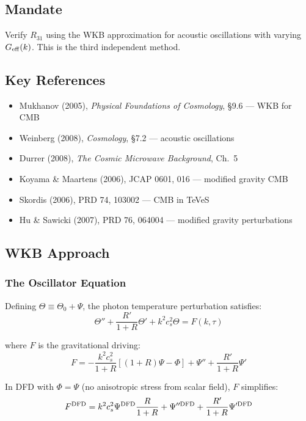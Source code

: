 \documentclass[11pt,a4paper]{article}
\begin{document}
\subsection{Mandate}

Verify $R_{31}$ using the WKB approximation for acoustic oscillations with varying $G_{\rm eff}(k)$. This is the third independent method.

\subsection{Key References}

\begin{itemize}
\item Mukhanov (2005), \emph{Physical Foundations of Cosmology}, \S 9.6 --- WKB for CMB
\item Weinberg (2008), \emph{Cosmology}, \S 7.2 --- acoustic oscillations
\item Durrer (2008), \emph{The Cosmic Microwave Background}, Ch.\ 5
\item Koyama \& Maartens (2006), JCAP 0601, 016 --- modified gravity CMB
\item Skordis (2006), PRD 74, 103002 --- CMB in TeVeS
\item Hu \& Sawicki (2007), PRD 76, 064004 --- modified gravity perturbations
\end{itemize}

\subsection{WKB Approach}

\subsubsection{The Oscillator Equation}

Defining $\Theta \equiv \Theta_0 + \Psi$, the photon temperature perturbation satisfies:
\begin{equation}
\Theta'' + \frac{R'}{1+R}\Theta' + k^2c_s^2\Theta = F(k, \tau)
\end{equation}

where $F$ is the gravitational driving:
\begin{equation}
F = -\frac{k^2c_s^2}{1+R}\left[(1+R)\Psi - \Phi\right] + \Psi'' + \frac{R'}{1+R}\Psi'
\end{equation}

In DFD with $\Phi = \Psi$ (no anisotropic stress from scalar field), $F$ simplifies:
\begin{equation}
F^{\rm DFD} = k^2c_s^2\Psi^{\rm DFD}\frac{R}{1+R} + \Psi''^{\rm DFD} + \frac{R'}{1+R}\Psi'^{\rm DFD}
\end{equation}
\end{document}
